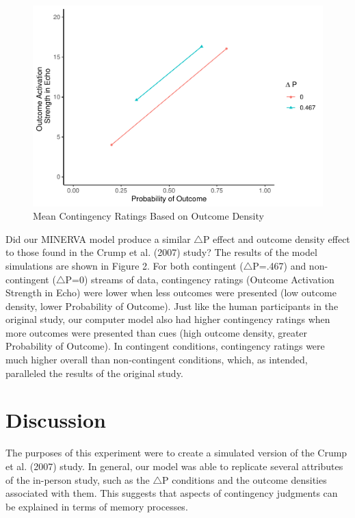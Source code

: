 \documentclass[
  english,
  man,floatsintext]{apa6}
\begin{document}
\begin{figure}
\centering
\includegraphics{thesis_files/figure-latex/unnamed-chunk-3-1.pdf}
\caption{\label{fig:unnamed-chunk-3}Mean Contingency Ratings Based on Outcome Density}
\end{figure}

Did our MINERVA model produce a similar \(\triangle\)P effect and outcome density effect to those found in the Crump et al. (2007) study? The results of the model simulations are shown in Figure 2. For both contingent (\(\triangle\)P=.467) and non-contingent (\(\triangle\)P=0) streams of data, contingency ratings (Outcome Activation Strength in Echo) were lower when less outcomes were presented (low outcome density, lower Probability of Outcome). Just like the human participants in the original study, our computer model also had higher contingency ratings when more outcomes were presented than cues (high outcome density, greater Probability of Outcome). In contingent conditions, contingency ratings were much higher overall than non-contingent conditions, which, as intended, paralleled the results of the original study.

\hypertarget{discussion}{%
\section{Discussion}\label{discussion}}

The purposes of this experiment were to create a simulated version of the Crump et al. (2007) study. In general, our model was able to replicate several attributes of the in-person study, such as the \(\triangle\)P conditions and the outcome densities associated with them. This suggests that aspects of contingency judgments can be explained in terms of memory processes.
\end{document}
